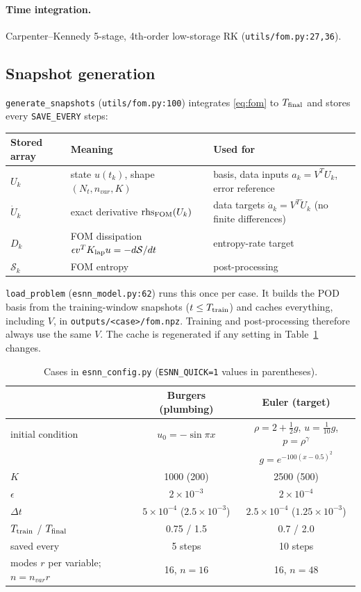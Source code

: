 \documentclass[11pt,a4paper]{article}
\newcommand{\code}[1]{\texttt{\small #1}}
\newcommand{\Sc}{\mathcal S}
\begin{document}
\paragraph{Time integration.} Carpenter--Kennedy 5-stage, 4th-order low-storage RK (\code{utils/fom.py:27,36}).

\subsection{Snapshot generation}
\code{generate\_snapshots} (\code{utils/fom.py:100}) integrates \eqref{eq:fom} to $T_{\rm final}$ and stores every \code{SAVE\_EVERY} steps:
\begin{center}
\begin{tabular}{p{2.9cm}p{4.0cm}p{8.2cm}}
\toprule
Stored array & Meaning & Used for\\\midrule
$U_k$ & state $u(t_k)$, shape $(N_t,n_{var},K)$ & basis, data inputs $a_k=V^TU_k$, error reference\\
$\dot U_k$ & exact derivative $\mathrm{rhs}_{\rm FOM}(U_k)$ & data targets $\dot a_k=V^T\dot U_k$ (no finite differences)\\
$D_k$ & FOM dissipation $\epsilon v^TK_{\rm lap}u=-d\Sc/dt$ & entropy-rate target\\
$\Sc_k$ & FOM entropy & post-processing\\
\bottomrule
\end{tabular}
\end{center}
\noindent\code{load\_problem} (\code{esnn\_model.py:62}) runs this once per case. It builds the POD basis from the training-window snapshots ($t\le T_{\rm train}$) and caches everything, including $V$, in \code{outputs/<case>/fom.npz}. Training and post-processing therefore always use the same $V$. The cache is regenerated if any setting in Table~\ref{tab:cases} changes.

\begin{table}[h]\centering
\caption{Cases in \code{esnn\_config.py} (\code{ESNN\_QUICK=1} values in parentheses).}\label{tab:cases}
\begin{tabular}{lcc}
\toprule
& Burgers (plumbing) & Euler (target)\\\midrule
initial condition & $u_0=-\sin\pi x$ & $\rho=2+\tfrac12 g$, $u=\tfrac1{10}g$, $p=\rho^\gamma$\\
 & & $g=e^{-100(x-0.5)^2}$\\
$K$ & 1000 (200) & 2500 (500)\\
$\epsilon$ & $2\times10^{-3}$ & $2\times10^{-4}$\\
$\Delta t$ & $5\times10^{-4}$ ($2.5\times10^{-3}$) & $2.5\times10^{-4}$ ($1.25\times10^{-3}$)\\
$T_{\rm train}$ / $T_{\rm final}$ & 0.75 / 1.5 & 0.7 / 2.0\\
saved every & 5 steps & 10 steps\\
modes $r$ per variable; $n=n_{var}r$ & 16, $n=16$ & 16, $n=48$\\
\bottomrule
\end{tabular}
\end{table}
\end{document}
